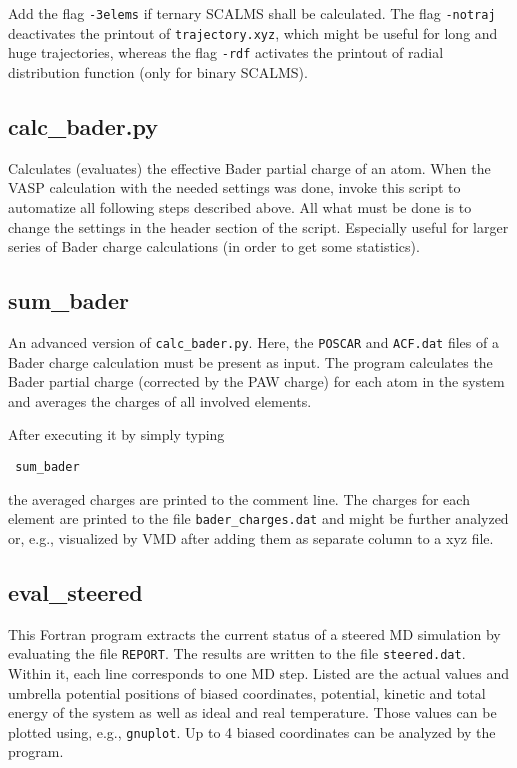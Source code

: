 \documentclass[a4paper,11pt]{article}
\begin{document}
Add the flag \texttt{-3elems} if ternary SCALMS shall be calculated.
The flag \texttt{-notraj} deactivates the printout of \texttt{trajectory.xyz}, which
might be useful for long and huge trajectories, whereas the flag \texttt{-rdf} activates
the printout of radial distribution function (only for binary SCALMS).

\subsection{calc\_bader.py}\label{calc_bader}

Calculates (evaluates) the effective Bader partial charge of an atom.
When the VASP calculation with the needed settings was done, invoke this 
script to automatize all following steps described above.
All what must be done is to change the settings in the header section 
of the script.
Especially useful for larger series of Bader charge calculations (in order 
to get some statistics).

\subsection{sum\_bader}\label{sum_bader}

An advanced version of \texttt{calc\_bader.py}. Here, the \texttt{POSCAR} 
and \texttt{ACF.dat} files of a Bader charge calculation must be present as input.
The program calculates the Bader partial charge (corrected by the PAW charge)
for each atom in the system and averages the charges of all involved elements.

After executing it by simply typing

\begin{verbatim}
 sum_bader
\end{verbatim}

the averaged charges are printed to the comment line.
The charges for each element are printed to the file \texttt{bader\_charges.dat} and might 
be further analyzed or, e.g., visualized by VMD after adding them as separate column
to a xyz file.

\subsection{eval\_steered}\label{eval_steered}

This Fortran program extracts the current status of a steered MD simulation by
evaluating the file \texttt{REPORT}. The results are written to the file
\texttt{steered.dat}. Within it, each line corresponds to one MD step.
Listed are the actual values and umbrella potential positions of biased coordinates,
potential, kinetic and total energy of the system as well as ideal and real temperature.
Those values can be plotted using, e.g., \texttt{gnuplot}. Up to 4 biased coordinates
can be analyzed by the program.
\end{document}
